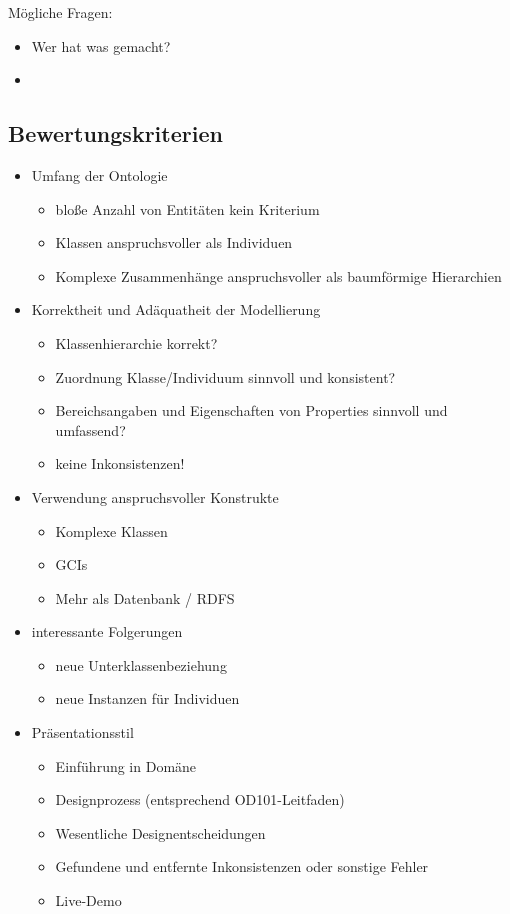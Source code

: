 \documentclass[a4paper]{article}
\begin{document}
Mögliche Fragen:

\begin{itemize}
    \item Wer hat was gemacht? 
    \item 
\end{itemize}

\subsection{Bewertungskriterien}

\begin{itemize}
    \item Umfang der Ontologie
    \begin{itemize}
        \item bloße Anzahl von Entitäten kein Kriterium
        \item Klassen anspruchsvoller als Individuen
        \item Komplexe Zusammenhänge anspruchsvoller als baumförmige Hierarchien
    \end{itemize}
    \item Korrektheit und Adäquatheit der Modellierung
    \begin{itemize}
        \item Klassenhierarchie korrekt?
        \item Zuordnung Klasse/Individuum sinnvoll und konsistent?
        \item Bereichsangaben und Eigenschaften von Properties sinnvoll und umfassend?
        \item keine Inkonsistenzen!
    \end{itemize}
    \item Verwendung anspruchsvoller Konstrukte
    \begin{itemize}
        \item Komplexe Klassen
        \item GCIs
        \item Mehr als Datenbank / RDFS
    \end{itemize}
    \item interessante Folgerungen
    \begin{itemize}
        \item neue Unterklassenbeziehung
        \item neue Instanzen für Individuen
    \end{itemize}
    \item Präsentationsstil
    \begin{itemize}
        \item Einführung in Domäne
        \item Designprozess (entsprechend OD101-Leitfaden)
        \item Wesentliche Designentscheidungen
        \item Gefundene und entfernte Inkonsistenzen oder sonstige Fehler
        \item Live-Demo
    \end{itemize}
\end{itemize}
\end{document}
